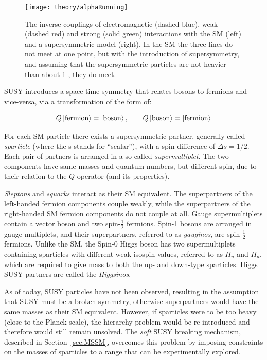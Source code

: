 		\begin{figure}[!htb]
			\centering
			\texttt{[image: theory/alphaRunning]}
			\caption{\label{fig:alphaRunning} The inverse couplings of electromagnetic (dashed blue), weak (dashed red) and strong (solid green) interactions with the \ac{SM} (left) and a supersymmetric model (right). In the \ac{SM} the three lines do not meet at one point, but with the introduction of supersymmetry, and assuming that the supersymmetric particles are not heavier than about 1 \TeV, they do meet.}
		\end{figure}		

		\ac{SUSY} introduces a space-time symmetry that relates bosons to fermions and vice-versa, via a transformation of the form of:  

		\begin{equation}
		\label{eq:susy_transformation}
			Q \ket{\mathrm{fermion}} = \ket{\mathrm{boson}}, \qquad Q \ket{\mathrm{boson}} = \ket{\mathrm{fermion}}
		\end{equation}

		\noindent For each \ac{SM} particle there exists a supersymmetric partner, generally called \textit{sparticle} (where the s stands for “scalar”), with a spin difference of $\Delta s = 1/2$. Each pair of partners is arranged in a so-called \textit{supermultiplet}. The two components have same masses and quantum numbers, but different spin, due to their relation to the $Q$ operator (and its properties). 

		\textit{Sleptons} and \textit{squarks} interact as their \ac{SM} equivalent. The superpartners of the left-handed fermion components couple weakly, while the superpartners of the right-handed \ac{SM} fermion components do not couple at all. 
		Gauge supermultiplets contain a vector boson and two spin-$\frac{1}{2}$ fermions. Spin-1 bosons are arranged in gauge multiplets, and their superpartners, referred to as \textit{gauginos}, are spin-$\frac{1}{2}$ fermions. Unlike the \ac{SM}, the Spin-0 Higgs boson has two supermultiplets containing sparticles with different weak isospin values, referred to as $H_u$ and $H_d$, which are required to give mass to both the up- and down-type sparticles. Higgs \ac{SUSY} partners are called the \textit{Higgsinos}.

		As of today, \ac{SUSY} particles have not been observed, resulting in the assumption that \ac{SUSY} must be a broken symmetry, otherwise superpartners would have the same masses as their \ac{SM} equivalent. However, if sparticles were to be too heavy (close to the Planck scale), the hierarchy problem would be re-introduced and therefore would still remain unsolved. The \emph{soft} \ac{SUSY} breaking mechanism, described in Section~\ref{sec:MSSM}, overcomes this problem by imposing constraints on the masses of sparticles to a range that can be experimentally explored. 		


